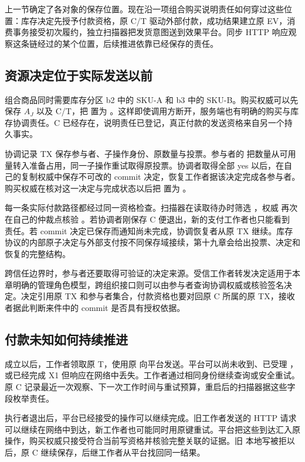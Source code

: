 上一节确定了各对象的保存位置。现在沿一项组合购买说明责任如何穿过这些位置：库存决定先授予付款资格，原 C/T 驱动外部付款，成功结果建立原 EV，消费事务接受初次履约，独立扫描器把发货意图送到效果平台。同步 HTTP 响应观察这条链经过的某个位置，后续推进依靠已经保存的责任。

\subsection{资源决定位于实际发送以前}

组合商品同时需要库存分区 b2 中的 SKU-A 和 b3 中的 SKU-B。购买权威可以先保存 $A_J$ 以及 C/T，把  置为 。这样即使调用方断开，服务端也有明确的购买与库存协调责任。C 已经存在，说明责任已登记，真正付款的发送资格来自另一个持久事实。


协调记录 TX 保存参与者、子操作身份、原数量与投票。参与者的  把数量从可用量转入准备占用，同一子操作重试取得原投票。协调者取得全部 yes 以后，在自己的复制权威中保存不可改的 commit 决定，恢复工作者据该决定完成各参与者。购买权威在核对这一决定与完成状态以后把  置为 。

每一条实际付款路径都经过同一资格检查。扫描器在读取待办时筛选 ，权威  再次在自己的仲裁点核验 。若协调者刚保存 C 便退出，新的支付工作者也只能看到  责任。若 commit 决定已保存而通知尚未完成，协调恢复者从原 TX 继续。库存协议的内部原子决定与外部支付按不同保存域接续，第十九章会给出投票、决定和恢复的完整结构。

跨信任边界时，参与者还要取得可验证的决定来源。受信工作者转发决定适用于本章明确的管理角色模型，跨组织接口则可以由参与者查询协调权威或核验签名决定。决定引用原 TX 和参与者集合，付款资格也要对回原 C 所属的原 TX，接收者据此判断来件中的 commit 是否具有授权依据。

\subsection{付款未知如何持续推进}

 成立以后，工作者领取原 T，使用原  向平台发送。平台可以尚未收到、已受理 ，或已经完成 X1 但响应在网络中丢失。工作者通过相同身份继续查询或安全重试。原 C 记录最近一次观察、下一次工作时间与重试预算，重启后的扫描器据这些字段枚举责任。

执行者退出后，平台已经接受的操作可以继续完成。旧工作者发送的 HTTP 请求可以继续在网络中到达，新工作者也可能同时用原键重试。平台把这些到达汇入原操作，购买权威只接受符合当前写资格并核验完整关联的证据。旧  本地写被拒以后，原 C 继续保存，后继工作者从平台找回同一结果。

